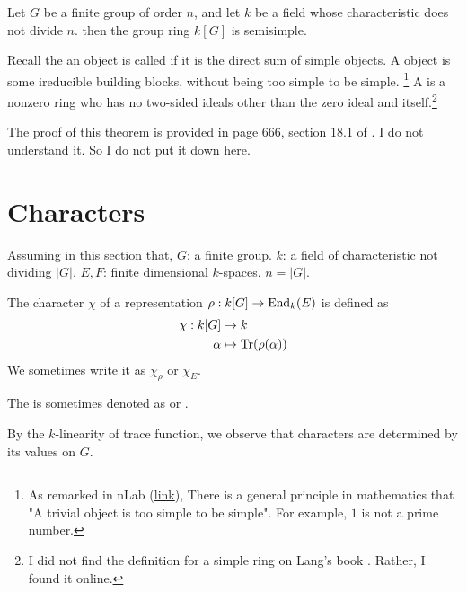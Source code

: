 \documentclass{article}
\begin{document}
\begin{thm}[Maschke]
    Let $G$ be a finite group of order $n$, and let $k$ be a field
    whose characteristic does not divide $n$. then the group ring
    $k[G]$ is semisimple.
\end{thm}
Recall the an object is called  if it is the direct
sum of simple objects. A  object is some ireducible
building blocks, without being too simple to be simple. \footnote{
    As remarked in nLab
    (\href{https://ncatlab.org/nlab/show/too+simple+to+be+simple}{link}),
    There is a general principle in mathematics that "A trivial object
    is too simple to be simple". For example, $1$ is not a prime
number.} A  is a nonzero ring who has no two-sided ideals
other than the zero ideal and itself.\footnote{ I did not find the
    definition for a simple ring on Lang's book \cite{lang-algebra}.
Rather, I found it online.}

The proof of this theorem is provided in page 666, section 18.1 of
\cite{lang-algebra}. I do not understand it. So I do not put it down
here.

\section{Characters}
\label{sec:Characters}
Assuming in this section that, $G$: a finite group. $k$: a field of
characteristic not dividing $|G|$. $E,F$: finite dimensional $k$-spaces.
$n=|G|$.

\begin{defi}
    The character $\chi$ of a representation $\rho:k[G]\to \operatorname{End}_k(E)$
    is defined as
    \begin{align}
        \chi: k[G] &\to k \\
        \alpha &\mapsto \operatorname{Tr}(\rho(\alpha))
    \end{align}
    We sometimes write it as $\chi_\rho$ or $\chi_E$.
\end{defi}
The  is sometimes denoted as 
or .

\begin{remark}
By the $k$-linearity of trace function, we observe that characters are
determined by its values on $G$.
\end{remark}
\end{document}

